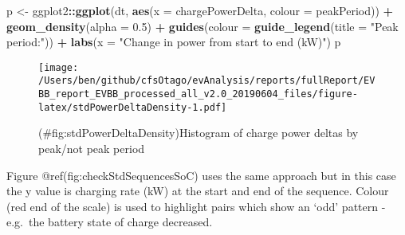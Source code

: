 \documentclass[]{article}
\newenvironment{Shaded}{\begin{snugshade}}{\end{snugshade}}
\newcommand{\DataTypeTok}[1]{\textcolor[rgb]{0.13,0.29,0.53}{#1}}
\newcommand{\FloatTok}[1]{\textcolor[rgb]{0.00,0.00,0.81}{#1}}
\newcommand{\KeywordTok}[1]{\textcolor[rgb]{0.13,0.29,0.53}{\textbf{#1}}}
\newcommand{\NormalTok}[1]{#1}
\newcommand{\OperatorTok}[1]{\textcolor[rgb]{0.81,0.36,0.00}{\textbf{#1}}}
\newcommand{\StringTok}[1]{\textcolor[rgb]{0.31,0.60,0.02}{#1}}
\begin{document}
\begin{Shaded}
\begin{Highlighting}[]
\NormalTok{p <-}\StringTok{ }\NormalTok{ggplot2}\OperatorTok{::}\KeywordTok{ggplot}\NormalTok{(dt, }\KeywordTok{aes}\NormalTok{(}\DataTypeTok{x =}\NormalTok{ chargePowerDelta, }\DataTypeTok{colour =}\NormalTok{ peakPeriod)) }\OperatorTok{+}
\StringTok{  }\KeywordTok{geom_density}\NormalTok{(}\DataTypeTok{alpha =} \FloatTok{0.5}\NormalTok{) }\OperatorTok{+}
\StringTok{  }\KeywordTok{guides}\NormalTok{(}\DataTypeTok{colour =} \KeywordTok{guide_legend}\NormalTok{(}\DataTypeTok{title =} \StringTok{"Peak period:"}\NormalTok{)) }\OperatorTok{+}
\StringTok{  }\KeywordTok{labs}\NormalTok{(}\DataTypeTok{x =} \StringTok{"Change in power from start to end (kW)"}\NormalTok{)}
\NormalTok{p}
\end{Highlighting}
\end{Shaded}

\begin{figure}
\centering
\texttt{[image: /Users/ben/github/cfsOtago/evAnalysis/reports/fullReport/EVBB\_report\_EVBB\_processed\_all\_v2.0\_20190604\_files/figure-latex/stdPowerDeltaDensity-1.pdf]}
\caption{(\#fig:stdPowerDeltaDensity)Histogram of charge power deltas by peak/not peak period}
\end{figure}

Figure @ref(fig:checkStdSequencesSoC) uses the same approach but in this case the y value is charging rate (kW) at the start and end of the sequence. Colour (red end of the scale) is used to highlight pairs which show an `odd' pattern - e.g.~the battery state of charge decreased.
\end{document}
